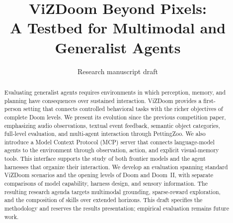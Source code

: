 \documentclass[10pt,twocolumn]{article}
\title{ViZDoom Beyond Pixels:\\A Testbed for Multimodal and Generalist Agents}
\author{Research manuscript draft}
\date{\snapshot}
\begin{document}
\maketitle
\begin{abstract}
Evaluating generalist agents requires environments in which perception, memory, and planning have consequences over sustained interaction. ViZDoom provides a first-person setting that connects controlled behavioral tasks with the richer objectives of complete Doom levels. We present its evolution since the previous competition paper, emphasizing audio observations, textual event feedback, semantic object categories, full-level evaluation, and multi-agent interaction through PettingZoo. We also introduce a Model Context Protocol (MCP) server that connects language-model agents to the environment through observation, action, and explicit visual-memory tools. This interface supports the study of both frontier models and the agent harnesses that organize their interaction. We develop an evaluation spanning standard ViZDoom scenarios and the opening levels of Doom and Doom~II, with separate comparisons of model capability, harness design, and sensory information. The resulting research agenda targets multimodal grounding, sparse-reward exploration, and the composition of skills over extended horizons. This draft specifies the methodology and reserves the results presentation; empirical evaluation remains future work.
\end{abstract}







\balance


\end{document}
